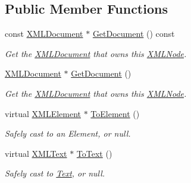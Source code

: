 \subsection*{Public Member Functions}
\begin{DoxyCompactItemize}
\item 
\mbox{\label{classtinyxml2_1_1XMLNode_a2de84cfa4ec3fe249bad745069d145f1}} 
const \hyperlink{classtinyxml2_1_1XMLDocument}{X\+M\+L\+Document} $\ast$ \hyperlink{classtinyxml2_1_1XMLNode_a2de84cfa4ec3fe249bad745069d145f1}{Get\+Document} () const
\begin{DoxyCompactList}\small\item\em Get the \hyperlink{classtinyxml2_1_1XMLDocument}{X\+M\+L\+Document} that owns this \hyperlink{classtinyxml2_1_1XMLNode}{X\+M\+L\+Node}. \end{DoxyCompactList}\item 
\mbox{\label{classtinyxml2_1_1XMLNode_af343d1ef0b45c0020e62d784d7e67a68}} 
\hyperlink{classtinyxml2_1_1XMLDocument}{X\+M\+L\+Document} $\ast$ \hyperlink{classtinyxml2_1_1XMLNode_af343d1ef0b45c0020e62d784d7e67a68}{Get\+Document} ()
\begin{DoxyCompactList}\small\item\em Get the \hyperlink{classtinyxml2_1_1XMLDocument}{X\+M\+L\+Document} that owns this \hyperlink{classtinyxml2_1_1XMLNode}{X\+M\+L\+Node}. \end{DoxyCompactList}\item 
\mbox{\label{classtinyxml2_1_1XMLNode_aab516e699567f75cc9ab2ef2eee501e8}} 
virtual \hyperlink{classtinyxml2_1_1XMLElement}{X\+M\+L\+Element} $\ast$ \hyperlink{classtinyxml2_1_1XMLNode_aab516e699567f75cc9ab2ef2eee501e8}{To\+Element} ()
\begin{DoxyCompactList}\small\item\em Safely cast to an Element, or null. \end{DoxyCompactList}\item 
\mbox{\label{classtinyxml2_1_1XMLNode_a41c55dab9162d1eb62db2008430e376b}} 
virtual \hyperlink{classtinyxml2_1_1XMLText}{X\+M\+L\+Text} $\ast$ \hyperlink{classtinyxml2_1_1XMLNode_a41c55dab9162d1eb62db2008430e376b}{To\+Text} ()
\begin{DoxyCompactList}\small\item\em Safely cast to \hyperlink{classText}{Text}, or null. \end{DoxyCompactList}\item 

\end{DoxyCompactItemize}
